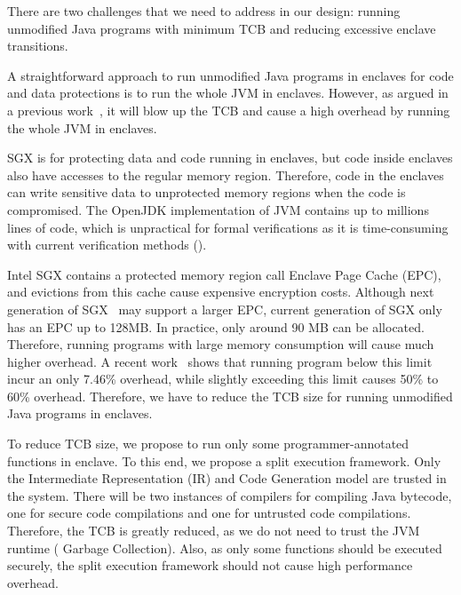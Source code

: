 There are two challenges that we need to address in our design:
running unmodified Java programs with minimum TCB and
reducing excessive enclave transitions.

A straightforward approach to run unmodified Java programs in enclaves for
code and data protections is to run the whole JVM in enclaves.
However, as argued in a previous work~\cite{securekeeper},
it will blow up the TCB and cause a high overhead by running the whole JVM in 
enclaves.

SGX is for protecting data and code running in enclaves, but code inside 
enclaves
also have accesses to the regular memory region. Therefore, code in the enclaves
can write sensitive data to unprotected memory regions when the code is 
compromised.
The OpenJDK implementation of JVM contains up to millions lines of code, which
is unpractical for formal verifications as it is time-consuming with
current verification methods ().

Intel SGX contains a protected memory region call Enclave Page Cache (EPC), and 
evictions
from this cache cause expensive encryption costs.
Although next generation of SGX~\cite{intel-sgx2} may support a larger EPC,
current generation of SGX only has an EPC up to 128MB. In practice, only around
90 MB can be allocated. Therefore, running programs with large memory 
consumption
will cause much higher overhead. A recent work~\cite{opaque:nsdi17} shows that
running program below this limit incur an only 7.46\% overhead, while slightly
exceeding this limit causes 50\% to 60\% overhead.
Therefore, we have to reduce the TCB size for running unmodified Java programs
in enclaves.

To reduce TCB size, we propose to run only some programmer-annotated functions
in enclave. To this end, we propose a split execution framework.
Only the Intermediate Representation (IR)
and Code Generation model are trusted in the system. There will be two instances
of compilers for compiling Java bytecode, one for secure code compilations and 
one
for untrusted code compilations. Therefore, the TCB is greatly reduced, as we
do not need to trust the JVM runtime (\eg{} Garbage Collection). Also, as only
some functions should be executed securely, the split execution framework
should not cause high performance overhead.

